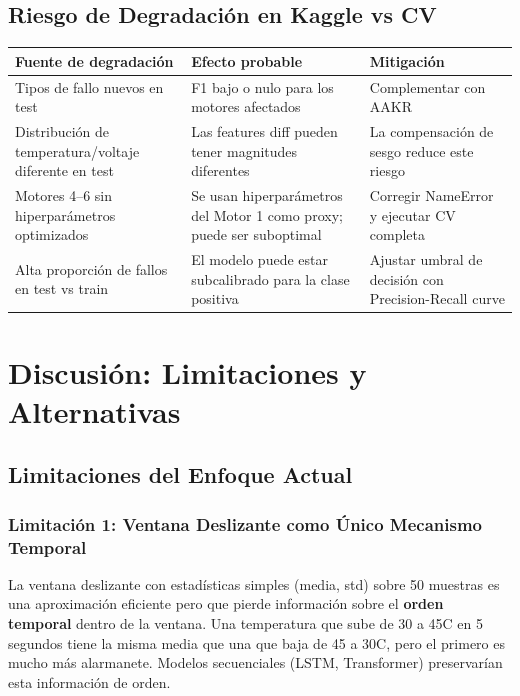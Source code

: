 \documentclass[12pt,a4paper]{article}
\begin{document}
\subsection{Riesgo de Degradaci\'{o}n en Kaggle vs CV}

\begin{center}
\begin{tabular}{p{5cm}p{4.5cm}p{3.5cm}}
\toprule
\textbf{Fuente de degradaci\'{o}n} & \textbf{Efecto probable} & \textbf{Mitigaci\'{o}n} \\
\midrule
Tipos de fallo nuevos en test &
  F1 bajo o nulo para los motores afectados &
  Complementar con AAKR \\
\addlinespace
Distribución de temperatura/voltaje diferente en test &
  Las features diff pueden tener magnitudes diferentes &
  La compensaci\'{o}n de sesgo reduce este riesgo \\
\addlinespace
Motores 4--6 sin hiperpar\'{a}metros optimizados &
  Se usan hiperpar\'{a}metros del Motor 1 como proxy; puede ser suboptimal &
  Corregir NameError y ejecutar CV completa \\
\addlinespace
Alta proporci\'{o}n de fallos en test vs train &
  El modelo puede estar subcalibrado para la clase positiva &
  Ajustar umbral de decisi\'{o}n con Precision-Recall curve \\
\bottomrule
\end{tabular}
\end{center}

\section{Discusi\'{o}n: Limitaciones y Alternativas}

\subsection{Limitaciones del Enfoque Actual}

\subsubsection{Limitaci\'{o}n 1: Ventana Deslizante como \'{U}nico Mecanismo Temporal}

La ventana deslizante con estad\'{i}sticas simples (media, std) sobre 50 muestras es
una aproximaci\'{o}n eficiente pero que pierde informaci\'{o}n sobre el \textbf{orden temporal}
dentro de la ventana. Una temperatura que sube de 30 a 45\textdegree{}C en 5 segundos
tiene la misma media que una que baja de 45 a 30\textdegree{}C, pero el primero es
mucho m\'{a}s alarmanete. Modelos secuenciales (LSTM, Transformer) preservar\'{i}an
esta informaci\'{o}n de orden.
\end{document}
